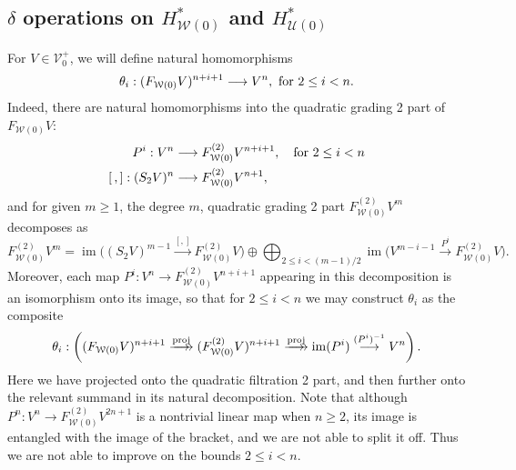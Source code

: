 \documentclass[11pt]{amsart}
\theoremstyle{plain}
\theoremstyle{definition}
\DeclareMathOperator{\im}{im}
\renewcommand{\to}{\longrightarrow}
\newcommand{\calW}{\mathcal{W}}
\newcommand{\calU}{\mathcal{U}}
\newcommand{\calV}{\mathcal{V}}
\theoremstyle{plain}
\newcommand{\vect}[2]{\calV^{#1}_{#2}}
\begin{document}
\begin{Cohomology operations for all unstable Lie algebras}
\subsection{$\delta$ operations on $H^*_{\calW(0)}$ and $H^*_{\calU(0)}$}
For $V\in \vect{+}{0}$, we will define natural homomorphisms
\[\theta_i:(F_{\calW(0)}V)^{n+i+1}\to V^{n}, \textup{ for $2\leq i<n$}.\]
Indeed, there are natural homomorphisms into the quadratic grading 2 part of $F_{\calW(0)}V$:
\begin{align*}
P^i:V^{n}&\to F_{\calW(0)}^{(2)}V^{n+i+1}, \textup{\quad  for $2\leq i<n$}\\
[\,,]:(S_2V)^{n}&\to F_{\calW(0)}^{(2)}V^{n+1},
\end{align*}
and for given $m\geq1$, the degree $m$, quadratic grading 2 part $F_{\calW(0)}^{(2)}V^m$ decomposes as
%
\[F_{\calW(0)}^{(2)}V^{m}=%
\im \bigl((S_2V)^{m-1}\overset{[,]}{\to} F_{\calW(0)}^{(2)}V\bigr)%
\oplus\bigoplus_{\!\!\!\!\!\!2\leq i< (m-1)/2\!\!\!\!\!\!}\im \bigl(V^{m-i-1}\overset{P^i}{\to}F_{\calW(0)}^{(2)}V\bigr).\]
Moreover, each map $P^i:V^n\to F_{\calW(0)}^{(2)}V^{n+i+1}$ appearing in this decomposition is an isomorphism onto its image, so that for $2\leq i <n$ we may construct $\theta_i$ as the composite
\[\theta_i:\left((F_{\calW(0)}V)^{n+i+1}\overset{\textup{proj}}{\makebox[.06ex][l]{$\to$}\to} (F_{\calW(0)}^{(2)}V)^{n+i+1}\overset{\textup{proj}}{\makebox[.06ex][l]{$\to$}\to} \im (P^i)\overset{(P^i)^{-1}}{\to}V^{n}\right).\]
Here we have projected onto the quadratic filtration 2 part, and then further onto the relevant summand in its natural decomposition. Note that although $P^n:V^n\to F_{\calW(0)}^{(2)}V^{2n+1}$ is a nontrivial linear map when $n\geq2$, its image is entangled with the image of the bracket, and we are not able to split it off. Thus we are not able to improve on the bounds $2\leq i< n$.


\end{Cohomology operations for all unstable Lie algebras}
\end{document}
